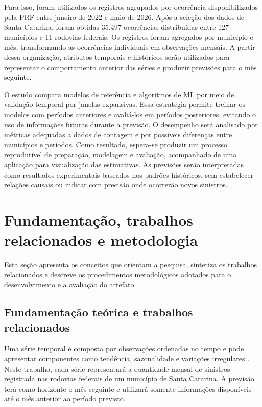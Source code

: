 \documentclass[12pt]{article}
\begin{document}
Para isso, foram utilizados os registros agrupados por ocorrência disponibilizados pela PRF entre janeiro de 2022 e maio de 2026. Após a seleção dos dados de Santa Catarina, foram obtidas 35.497 ocorrências distribuídas entre 127 municípios e 11 rodovias federais. Os registros foram agregados por município e mês, transformando as ocorrências individuais em observações mensais. A partir dessa organização, atributos temporais e históricos serão utilizados para representar o comportamento anterior das séries e produzir previsões para o mês seguinte.

O estudo compara modelos de referência e algoritmos de ML por meio de validação temporal por janelas expansivas. Essa estratégia permite treinar os modelos com períodos anteriores e avaliá-los em períodos posteriores, evitando o uso de informações futuras durante a previsão. O desempenho será analisado por métricas adequadas a dados de contagem e por possíveis diferenças entre municípios e períodos. Como resultado, espera-se produzir um processo reprodutível de preparação, modelagem e avaliação, acompanhado de uma aplicação para visualização das estimativas. As previsões serão interpretadas como resultados experimentais baseados nos padrões históricos, sem estabelecer relações causais ou indicar com precisão onde ocorrerão novos sinistros.

\section{Fundamentação, trabalhos relacionados e metodologia}

Esta seção apresenta os conceitos que orientam a pesquisa, sintetiza os trabalhos relacionados e descreve os procedimentos metodológicos adotados para o desenvolvimento e a avaliação do artefato.

\subsection{Fundamentação teórica e trabalhos relacionados}

Uma série temporal é composta por observações ordenadas no tempo e pode apresentar componentes como tendência, sazonalidade e variações irregulares \cite{hyndman2021forecasting}. Neste trabalho, cada série representará a quantidade mensal de sinistros registrada nas rodovias federais de um município de Santa Catarina. A previsão terá como horizonte o mês seguinte e utilizará somente informações disponíveis até o mês anterior ao período previsto.
\end{document}
